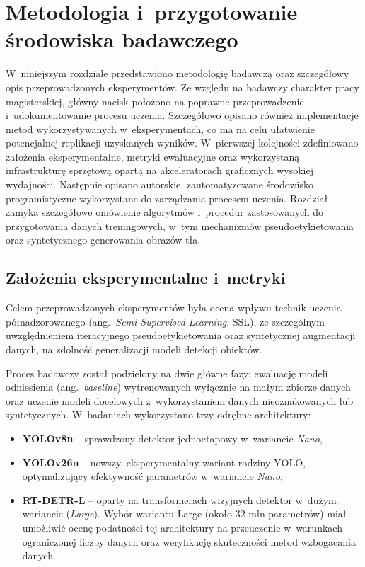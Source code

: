 \chapter{Metodologia i~przygotowanie środowiska badawczego}

W~niniejszym rozdziale przedstawiono metodologię badawczą oraz szczegółowy opis przeprowadzonych eksperymentów. Ze względu na badawczy charakter pracy magisterskiej, główny nacisk położono na poprawne przeprowadzenie i~udokumentowanie procesu uczenia. Szczegółowo opisano również implementacje metod wykorzystywanych w~eksperymentach, co ma na celu ułatwienie potencjalnej replikacji uzyskanych wyników. W~pierwszej kolejności zdefiniowano założenia eksperymentalne, metryki ewaluacyjne oraz wykorzystaną infrastrukturę sprzętową opartą na akceleratorach graficznych wysokiej wydajności. Następnie opisano autorskie, zautomatyzowane środowisko programistyczne wykorzystane do zarządzania procesem uczenia. Rozdział zamyka szczegółowe omówienie algorytmów i~procedur zastosowanych do przygotowania danych treningowych, w~tym mechanizmów pseudoetykietowania oraz syntetycznego generowania obrazów tła.

\section{Założenia eksperymentalne i~metryki}

Celem przeprowadzonych eksperymentów była ocena wpływu technik uczenia półnadzorowanego (ang.\ \emph{Semi-Supervised Learning}, SSL), ze szczególnym uwzględnieniem iteracyjnego pseudoetykietowania oraz syntetycznej augmentacji danych, na zdolność generalizacji modeli detekcji obiektów.

Proces badawczy został podzielony na dwie główne fazy: ewaluację modeli odniesienia (ang.\ \emph{baseline}) wytrenowanych wyłącznie na małym zbiorze danych oraz uczenie modeli docelowych z~wykorzystaniem danych nieoznakowanych lub syntetycznych. W~badaniach wykorzystano trzy odrębne architektury:
\begin{itemize}
    \item \textbf{YOLOv8n} -- sprawdzony detektor jednoetapowy w~wariancie \emph{Nano},
    \item \textbf{YOLOv26n} -- nowszy, eksperymentalny wariant rodziny YOLO, optymalizujący efektywność parametrów w~wariancie \emph{Nano},
    \item \textbf{RT-DETR-L} -- oparty na transformerach wizyjnych detektor w~dużym wariancie (\emph{Large}). Wybór wariantu Large (około 32 mln parametrów) miał umożliwić ocenę podatności tej architektury na przeuczenie w~warunkach ograniczonej liczby danych oraz weryfikację skuteczności metod wzbogacania danych.
\end{itemize}

